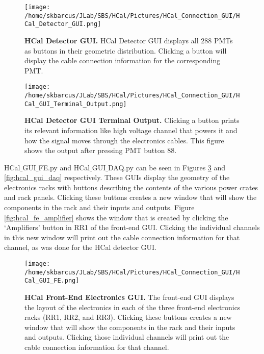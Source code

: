\documentclass[oneside]{book}   %
\begin{document}
	\begin{figure}[!ht]
	\begin{center}
	\texttt{[image: /home/skbarcus/JLab/SBS/HCal/Pictures/HCal\_Connection\_GUI/HCal\_Detector\_GUI.png]}
	\end{center}
	\caption{
	{\bf{HCal Detector GUI.}} HCal Detector GUI displays all 288 PMTs as buttons in their geometric distribution. Clicking a button will display the cable connection information for the corresponding PMT.}
	\label{fig:hcal_gui}
	\end{figure}	
	
	\begin{figure}[!ht]
	\begin{center}
	\texttt{[image: /home/skbarcus/JLab/SBS/HCal/Pictures/HCal\_Connection\_GUI/HCal\_GUI\_Terminal\_Output.png]}
	\end{center}
	\caption{
	{\bf{HCal Detector GUI Terminal Output.}} Clicking a button prints its relevant information like high voltage channel that powers it and how the signal moves through the electronics cables. This figure shows the output after pressing PMT button 88.}
	\label{fig:output}
	\end{figure}	
	
HCal$\_$GUI$\_$FE.py and HCal$\_$GUI$\_$DAQ.py can be seen in Figures \ref{fig:hcal_gui_fe} and \ref{fig:hcal_gui_daq} respectively. These GUIs display the geometry of the electronics racks with buttons describing the contents of the various power crates and rack panels. Clicking these buttons creates a new window that will show the components in the rack and their inputs and outputs. Figure \ref{fig:hcal_fe_amplifier} shows the window that is created by clicking the `Amplifiers' button in RR1 of the front-end GUI. Clicking the individual channels in this new window will print out the cable connection information for that channel, as was done for the HCal detector GUI.\\

	\begin{figure}[!ht]
	\begin{center}
	\texttt{[image: /home/skbarcus/JLab/SBS/HCal/Pictures/HCal\_Connection\_GUI/HCal\_GUI\_FE.png]}
	\end{center}
	\caption{
	{\bf{HCal Front-End Electronics GUI.}} The front-end GUI displays the layout of the electronics in each of the three front-end electronics racks (RR1, RR2, and RR3). Clicking these buttons creates a new window that will show the components in the rack and their inputs and outputs. Clicking those individual channels will print out the cable connection information for that channel.}
	\label{fig:hcal_gui_fe}
	\end{figure}	
	
\end{document}
